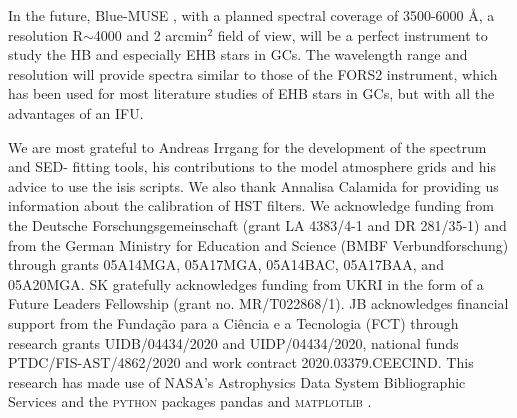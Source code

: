 \documentclass{aa}
\begin{document}
In the future, Blue-MUSE \citep{2019arXiv190601657R}, with a planned spectral coverage of 3500-6000 \AA, a resolution R$\sim$4000 and 2 arcmin$^2$ field of view, will be a perfect instrument to study the HB and especially EHB stars in GCs. The wavelength range and resolution will provide spectra similar to those of the FORS2 instrument, which has been used for most literature studies of EHB stars in GCs, but with all the advantages of an IFU. 



\begin{acknowledgements}
We are most grateful to Andreas Irrgang for the development of the spectrum and SED- fitting tools, his contributions to the model atmosphere grids and his advice to use the isis scripts.
 We also thank Annalisa Calamida for providing us information about the calibration of HST filters.
 We acknowledge funding from the Deutsche Forschungsgemeinschaft (grant LA 4383/4-1 and DR 281/35-1) and from the German Ministry for Education and Science (BMBF Verbundforschung) through grants 05A14MGA, 05A17MGA, 05A14BAC, 05A17BAA, and 05A20MGA. 
 SK gratefully acknowledges funding from UKRI in the form of a Future Leaders Fellowship (grant no. MR/T022868/1). JB acknowledges financial support from the Fundação para a Ciência e a
Tecnologia (FCT) through research grants UIDB/04434/2020 and UIDP/04434/2020, national funds PTDC/FIS-AST/4862/2020 and work contract 2020.03379.CEECIND.
 This research has made use of NASA’s Astrophysics Data System Bibliographic Services and the \textsc{python} packages pandas \citep{reback2020pandas,mckinney-proc-scipy-2010} and \textsc{matplotlib} \citep{Hunter:2007}.

\end{acknowledgements}

%
\end{document}

